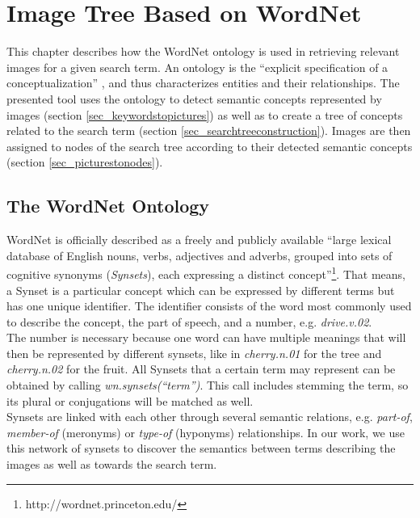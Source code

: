%
\section{Image Tree Based on WordNet}
\label{sec_wordnetsearchtree}
This chapter describes how the WordNet ontology is used in retrieving relevant images for a given search term. An ontology is the ``explicit specification of a conceptualization'' \cite{gruber1995ontology}, and thus characterizes entities and their relationships. The presented tool uses the ontology to detect semantic concepts represented by images (section  \ref{sec_keywordstopictures}) as well as to create a tree of concepts related to the search term (section \ref{sec_searchtreeconstruction}). Images are then assigned to nodes of the search tree according to their detected semantic concepts (section \ref{sec_picturestonodes}).

\subsection{The WordNet Ontology}
\label{sec_wordnet}
WordNet is officially described as a freely and publicly available ``large lexical database of English nouns, verbs, adjectives and adverbs, grouped into sets of cognitive synonyms (\emph{Synsets}), each expressing a distinct concept''\footnote{http://wordnet.princeton.edu/}. That means, a Synset is a particular concept which can be expressed by different terms but has one unique identifier. The identifier consists of the word most commonly used to describe the concept, the part of speech, and a number, e.g. \emph{drive.v.02}.\\
The number is necessary because one word can have multiple meanings that will then be represented by different synsets, like in \emph{cherry.n.01} for the tree and \emph{cherry.n.02} for the fruit. All Synsets that a certain term may represent can be obtained by calling \emph{wn.synsets(``term'')}. This call includes stemming the term, so its plural or conjugations will be matched as well.\\

Synsets are linked with each other through several semantic relations, e.g. \emph{part-of}, \emph{member-of} (meronyms) or \emph{type-of} (hyponyms)  relationships.
In our work, we use this network of synsets to discover the semantics between terms describing the images as well as towards the search term. \\

